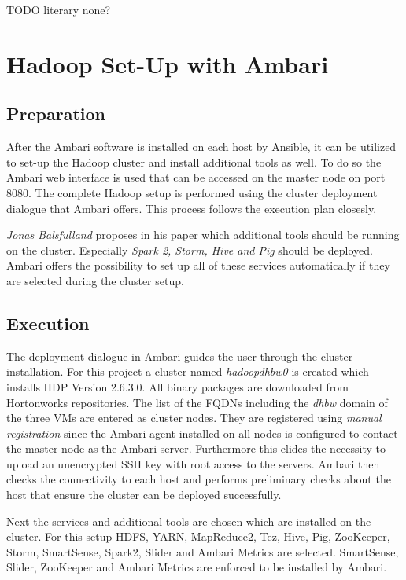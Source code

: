 TODO
literary none?

\section{Hadoop Set-Up with Ambari}

\subsection{Preparation}

After the Ambari software is installed on each host by Ansible, it can be utilized to set-up the Hadoop cluster and install additional tools as well.
To do so the Ambari web interface is used that can be accessed on the master node on port 8080. The complete Hadoop setup is performed using the cluster deployment dialogue that Ambari offers. This process follows the execution plan closesly.

\emph{Jonas Balsfulland} proposes in his paper which additional tools should be running on the cluster. Especially \emph{Spark 2, Storm, Hive and Pig} should be deployed.
Ambari offers the possibility to set up all of these services automatically if they are selected during the cluster setup.

\subsection{Execution}

The deployment dialogue in Ambari guides the user through the cluster installation.
For this project a cluster named \emph{hadoopdhbw0} is created which installs \ac{HDP} Version 2.6.3.0. All binary packages are downloaded from Hortonworks repositories.
The list of the \acp{FQDN} including the \emph{dhbw} domain of the three \acp{VM} are entered as cluster nodes. They are registered using \emph{manual registration} since the Ambari agent installed on all nodes is configured to contact the master node as the Ambari server. Furthermore this elides the necessity to upload an unencrypted \ac{SSH} key with root access to the servers.
Ambari then checks the connectivity to each host and performs preliminary checks about the host that ensure the cluster can be deployed successfully.

Next the services and additional tools are chosen which are installed on the cluster.
For this setup \ac{HDFS}, \ac{YARN}, MapReduce2, Tez, Hive, Pig, ZooKeeper, Storm, SmartSense, Spark2, Slider and Ambari Metrics are selected. SmartSense, Slider, ZooKeeper and Ambari Metrics are enforced to be installed by Ambari.


